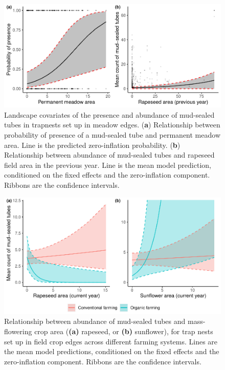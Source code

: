 \documentclass[smallextended]{svjour3}       %
\begin{document}
\begin{figure}
\includegraphics[width=1\linewidth]{solitary_bees_files/figure-latex/plots-meadowedge-1} \caption{Landscape covariates of the presence and abundance of mud-sealed tubes in trapnests set up in meadow edges. (\textbf{a}) Relationship between probability of presence of a mud-sealed tube and permanent meadow area. Line is the predicted zero-inflation probability. (\textbf{b}) Relationship between abundance of mud-sealed tubes and rapeseed field area in the previous year. Line is the mean model prediction, conditioned on the fixed effects and the zero-inflation component. Ribbons are the confidence intervals.}\label{fig:plots-meadowedge}
\end{figure}

\begin{figure}
\includegraphics[width=1\linewidth]{solitary_bees_files/figure-latex/plots-interac-1} \caption{Relationship between abundance of mud-sealed tubes and mass-flowering crop area (\textbf{(a)} rapeseed,  or \textbf{(b)} sunflower), for trap nests set up in field crop edges across different farming systems. Lines are the mean model predictions, conditioned on the fixed effects and the zero-inflation component. Ribbons are the confidence intervals.}\label{fig:plots-interac}
\end{figure}
\end{document}
